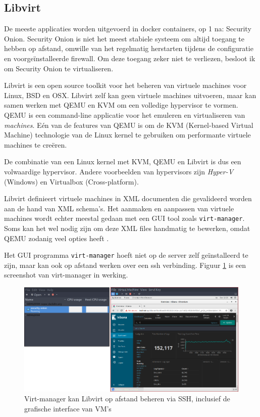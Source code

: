 \documentclass[a4paper, 12pt]{report}
\begin{document}
\subsection{Libvirt}
De meeste applicaties worden uitgevoerd in docker containers, op 1 na: Security Onion.
Security Onion is niet het meest stabiele systeem om altijd toegang te hebben op afstand, omwille van het regelmatig herstarten tijdens de configuratie en voorgeïnstalleerde firewall.
Om deze toegang zeker niet te verliezen, besloot ik om Security Onion te virtualiseren.

Libvirt is een open source toolkit voor het beheren van virtuele machines voor Linux, BSD en OSX.
Libvirt zelf kan geen virtuele machines uitvoeren, maar kan samen werken met QEMU en KVM om een volledige hypervisor te vormen.
QEMU is een command-line applicatie voor het emuleren en virtualiseren van \emph{machines}.
Eén van de features van QEMU is om de KVM (Kernel-based Virtual Machine) technologie van de Linux kernel te gebruiken om performante virtuele machines te creëren.

De combinatie van een Linux kernel met KVM, QEMU en Libvirt is dus een volwaardige hypervisor.
Andere voorbeelden van hypervisors zijn \emph{Hyper-V} (Windows) en Virtualbox (Cross-platform).

Libvirt definieert virtuele machines in XML documenten die gevalideerd worden aan de hand van XML schema's.
Het aanmaken en aanpassen van virtuele machines wordt echter meestal gedaan met een GUI tool zoals \lstinline|virt-manager|.
Soms kan het wel nodig zijn om deze XML files handmatig te bewerken, omdat QEMU zodanig veel opties heeft \autocite{libvirt:docs}.

Het GUI programma \lstinline|virt-manager| hoeft niet op de server zelf geïnstalleerd te zijn, maar kan ook op afstand werken over een ssh verbinding.
Figuur \ref{fig:virt-manager} is een screenshot van virt-manager in werking.

\begin{figure}[H]
  \centering
  \includegraphics[width=\textwidth]{virt-manager}
  \caption{Virt-manager kan Libvirt op afstand beheren via SSH, inclusief de grafische interface van VM's}
  \label{fig:virt-manager}
\end{figure}
\end{document}
